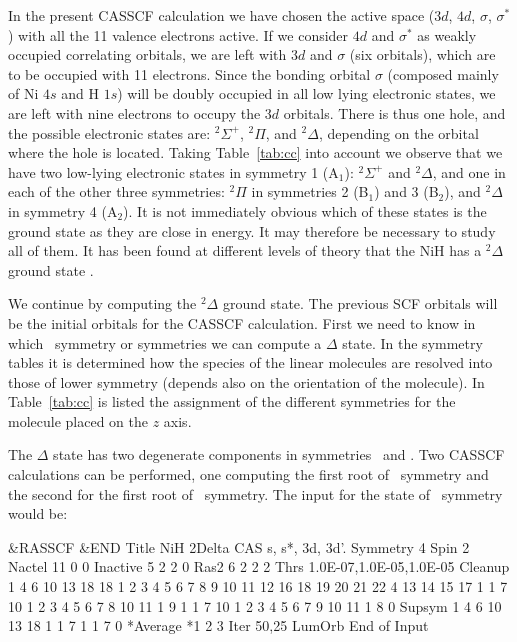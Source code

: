 
In the present CASSCF calculation we have chosen the active
space ($3d$, $4d$, $\sigma$, $\sigma^*$) with all the 11 valence
electrons active. If we consider $4d$ and $\sigma^*$ as weakly occupied
correlating orbitals, we are left with $3d$ and $\sigma$ (six orbitals),
which are to be occupied with 11 electrons. Since the bonding
orbital $\sigma$ (composed mainly of Ni $4s$ and H $1s$) will be doubly
occupied in all low lying electronic states, we are left with nine
electrons to occupy the $3d$ orbitals. There is thus one hole, and
the possible electronic states are: $^2\Sigma^+$, $^2\Pi$, and $^2\Delta$,
depending on the orbital where the hole is located. Taking Table~\ref{tab:cc}
into account we observe that we have two low-lying electronic states
in symmetry 1 (A$_1$): $^2\Sigma^+$ and $^2\Delta$, and one in each of
the other three symmetries: $^2\Pi$ in symmetries 2 (B$_1$) and 3 (B$_2$),
and $^2\Delta$ in symmetry 4 (A$_2$). It is not immediately obvious which
of these states is the ground state as they are close in energy. It may
therefore be necessary to study all of them. It has been found at different
levels of theory that the NiH has a $^2\Delta$ ground state \cite{Pou:94}.


We continue by computing the $^2\Delta$ ground state. The previous SCF
orbitals will be the initial orbitals for the CASSCF calculation. First
we need to know in which \Ctv\ symmetry or symmetries we can compute
a $\Delta$ state. In the symmetry tables it is determined how the species
of the linear molecules are resolved into those of lower symmetry
(depends also on the orientation of the molecule). In Table~\ref{tab:cc}
is listed the assignment of the different symmetries for the molecule
placed on the $z$ axis.


The $\Delta$ state has two degenerate components in symmetries \ao\ and \at.
Two CASSCF calculations can be performed, one computing
the first root of \at\ symmetry and the second for the first root of \ao\ symmetry.
The  input for the state of \at\ symmetry would be:

\begin{inputlisting}
 &RASSCF &END
Title
 NiH 2Delta CAS s, s*, 3d, 3d'.
Symmetry
    4
Spin
    2
Nactel
   11    0    0
Inactive
    5    2    2    0
Ras2
    6    2    2    2
Thrs
1.0E-07,1.0E-05,1.0E-05
Cleanup
1
  4 6 10 13 18
 18 1 2 3 4 5 6 7 8 9 10 11 12 16 18 19 20 21 22
  4 13 14 15 17
1
  1 7
  10 1 2 3 4 5 6 7 8 10 11
  1 9
1
  1 7
  10 1 2 3 4 5 6 7 9 10 11
  1 8
0
Supsym
1
   4 6 10 13 18
1
   1 7
1 
   1 7
0
*Average
*1 2 3
Iter
50,25
LumOrb
End of Input
\end{inputlisting}

